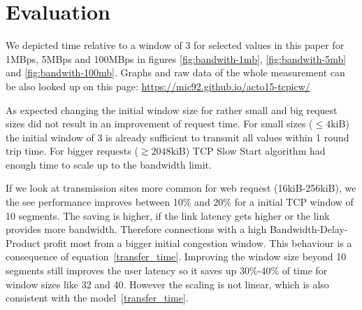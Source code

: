 \section{Evaluation}
\label{sec:evaluation}

We depicted time relative to a window of 3 for selected values in this paper for
1MBps, 5MBps and 100MBps in figures \ref{fig:bandwith-1mb},
\ref{fig:bandwith-5mb} and \ref{fig:bandwith-100mb}. Graphs and raw data of the
whole measurement can be also looked up on this page:
\url{https://mic92.github.io/acto15-tcpicw/}

As expected changing the initial window size for rather small and big request
sizes did not result in an improvement of request time. For small sizes
($\leq{}4\text{kiB}$) the initial window of 3 is already sufficient to transmit
all values within 1 round trip time. For bigger requests
($\gtrsim{}2048\text{kiB}$) TCP Slow Start algorithm had enough time to scale up
to the bandwidth limit.

If we look at transmission sites more common for web request (16kiB-256kiB), we
the see performance improves between 10\% and 20\% for a initial TCP window of
10 segments. The saving is higher, if the link latency gets higher or the link
provides more bandwidth. Therefore connections with a high
Bandwidth-Delay-Product profit most from a bigger initial congestion window.
This behaviour is a consequence of equation~\ref{transfer_time}. Improving the
window size beyond 10 segments still improves the user latency so it saves up
30\%-40\% of time for window sizes like 32 and 40. However the scaling is not
linear, which is also consistent with the model~\ref{transfer_time}.
